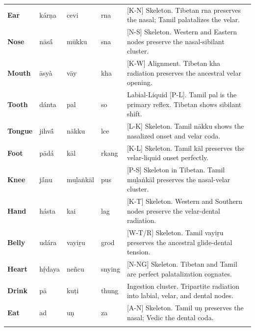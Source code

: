 \begin{longtable}{p{} p{} p{} p{} p{}}
\textbf{Ear} & kárṇa & cevi & rna & \small [K-N] Skeleton. Tibetan rna preserves the nasal; Tamil palatalizes the velar. \\ 
\addlinespace[10pt]

\textbf{Nose} & nāsā́ & mūkku & sna & \small [N-S] Skeleton. Western and Eastern nodes preserve the nasal-sibilant cluster. \\ 
\addlinespace[10pt]

\textbf{Mouth} & āsyà & vāy & kha & \small [K-W] Alignment. Tibetan kha radiation preserves the ancestral velar opening. \\ 
\addlinespace[10pt]

\textbf{Tooth} & dánta & pal & so & \small Labial-Liquid [P-L]. Tamil pal is the primary reflex. Tibetan shows sibilant shift. \\ 
\addlinespace[10pt]

\textbf{Tongue} & jihvā́ & nākku & lce & \small [L-K] Skeleton. Tamil nākku shows the nasalized onset and velar coda. \\ 
\addlinespace[10pt]

\textbf{Foot} & pādá & kāl & rkang & \small [K-L] Skeleton. Tamil kāl preserves the velar-liquid onset perfectly. \\ 
\addlinespace[10pt]

\textbf{Knee} & jā́nu & muḻaṅkāl & pus & \small [P-S] Skeleton in Tibetan. Tamil muḻaṅkāl preserves the nasal-velar cluster. \\ 
\addlinespace[10pt]

\textbf{Hand} & hásta & kai & lag & \small [K-T] Skeleton. Western and Southern nodes preserve the velar-dental radiation. \\ 
\addlinespace[10pt]

\textbf{Belly} & udára & vayiṟu & grod & \small [W-T/R] Skeleton. Tamil vayiṟu preserves the ancestral glide-dental tension. \\ 
\addlinespace[10pt]

\textbf{Heart} & hṛ́daya & neñcu & snying & \small [N-NG] Skeleton. Tibetan and Tamil are perfect palatalization cognates. \\ 
\addlinespace[10pt]

\textbf{Drink} & pā & kuṭi & thung & \small Ingestion cluster. Tripartite radiation into labial, velar, and dental nodes. \\ 
\addlinespace[10pt]

\textbf{Eat} & ad & uṇ & za & \small [A-N] Skeleton. Tamil uṇ preserves the nasal; Vedic the dental coda. \\ 
\addlinespace[10pt]


\end{longtable}
